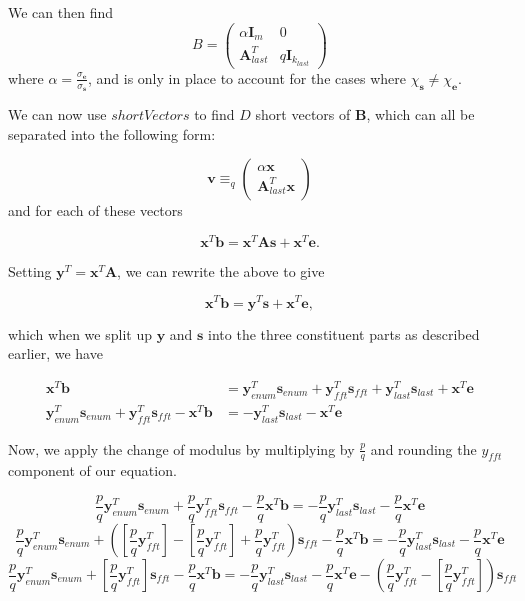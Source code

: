 \documentclass[a4paper, 10pt]{article}
\theoremstyle{definition}
\begin{document}
We can then find 
    \[B = \begin{pmatrix}
    \alpha \mathbf{I}_m & 0\\
    \mathbf{A}^T_{last} & q \mathbf{I}_{k_{last}}
\end{pmatrix}\]
where $\alpha = \frac{\sigma _\mathbf{e}}{\sigma _\mathbf{s}}$, and is only in place to account for the cases where $\chi _{\mathbf{s}} \neq \chi _{\mathbf{e}}$.

We can now use $shortVectors$ to find $D$ short vectors of $\mathbf{B}$, which can all be separated into the following form:

\[\mathbf{v} \equiv _q \begin{pmatrix}
\alpha \mathbf{x} \\
\mathbf{A}^T_{last}\mathbf{x}
\end{pmatrix}\]
and for each of these vectors 

\[\mathbf{x}^T\mathbf{b}=\mathbf{x}^T\mathbf{As}+\mathbf{x}^T\mathbf{e}.\]

Setting $\mathbf{y}^T = \mathbf{x}^T\mathbf{A}$, we can rewrite the above to give

\[\mathbf{x}^T\mathbf{b} = \mathbf{y}^T\mathbf{s} + \mathbf{x}^T\mathbf{e},\]

which when we split up $\mathbf{y}$ and $\mathbf{s}$ into the three constituent parts as described earlier, we have

\begin{align*}
    \mathbf{x}^T\mathbf{b} &= \mathbf{y}^T_{enum}\mathbf{s}_{enum} + \mathbf{y}^T_{fft}\mathbf{s}_{fft} + \mathbf{y}^T_{last}\mathbf{s}_{last} + \mathbf{x}^T\mathbf{e}\\ 
    \mathbf{y}^T_{enum}\mathbf{s}_{enum} + \mathbf{y}^T_{fft}\mathbf{s}_{fft} - \mathbf{x}^T\mathbf{b} &= -\mathbf{y}^T_{last}\mathbf{s}_{last} - \mathbf{x}^T\mathbf{e}
\end{align*}

Now, we apply the change of modulus by multiplying by $\frac{p}{q}$ and rounding the $y_{fft}$ component of our equation.

\[\frac{p}{q}\mathbf{y}^T_{enum}\mathbf{s}_{enum} + \frac{p}{q}\mathbf{y}^T_{fft}\mathbf{s}_{fft} - \frac{p}{q}\mathbf{x}^T\mathbf{b} = -\frac{p}{q}\mathbf{y}^T_{last}\mathbf{s}_{last} - \frac{p}{q}\mathbf{x}^T\mathbf{e}\]
\[\frac{p}{q}\mathbf{y}^T_{enum}\mathbf{s}_{enum} + (\left[\frac{p}{q}\mathbf{y}^T_{fft}\right]- \left[\frac{p}{q}\mathbf{y}^T_{fft}\right] + \frac{p}{q}\mathbf{y}^T_{fft})\mathbf{s}_{fft} - \frac{p}{q}\mathbf{x}^T\mathbf{b} = -\frac{p}{q}\mathbf{y}^T_{last}\mathbf{s}_{last} - \frac{p}{q}\mathbf{x}^T\mathbf{e}\]
\[\frac{p}{q}\mathbf{y}^T_{enum}\mathbf{s}_{enum} + \left[\frac{p}{q}\mathbf{y}^T_{fft}\right]\mathbf{s}_{fft} - \frac{p}{q}\mathbf{x}^T\mathbf{b} = -\frac{p}{q}\mathbf{y}^T_{last}\mathbf{s}_{last} - \frac{p}{q}\mathbf{x}^T\mathbf{e} - (\frac{p}{q}\mathbf{y}^T_{fft} - \left[\frac{p}{q}\mathbf{y}^T_{fft}\right])\mathbf{s}_{fft}\]
\end{document}

